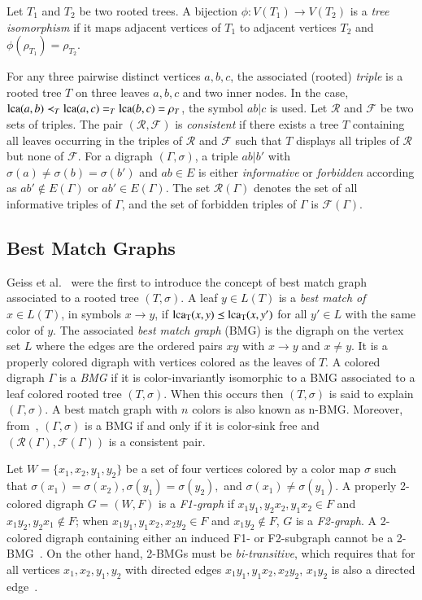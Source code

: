 \documentclass[final,3p,times]{elsarticle}
\begin{document}
Let $T_1$ and $T_2$ be two rooted trees. A bijection $\phi:V(T_1) \rightarrow V(T_2)$ is a \emph{tree isomorphism} if it maps adjacent vertices of $T_1$ to adjacent vertices $T_2$ and  $\phi(\rho_{T_1})=\rho_{T_2}$.

For any three pairwise distinct vertices $a,b,c$, the associated (rooted) \emph{triple} is a rooted tree $T$ on three leaves $a,b,c$ and two inner nodes. In the case, ${\rm{lca}}(a,b)\prec_T {\rm{lca}}(a,c)=_T{\rm{lca}}(b,c)=\rho_T$, the symbol $ab|c$ is used. Let $\mathscr{R}$ and $\mathscr{F}$ be two sets of triples. The pair $(\mathscr{R},\mathscr{F})$ is \emph{consistent} if there exists a tree $T$ containing all leaves occurring in the triples of $\mathscr{R}$ and $\mathscr{F}$ such that $T$ displays all triples of $\mathscr{R}$ but none of $\mathscr{F}$. For a digraph $(\Gamma,\sigma)$, a triple $ab|b'$ with $\sigma(a)\ne \sigma(b)=\sigma(b')$ and $ab\in E$ is either {\emph{informative}} or {\emph{forbidden}} according as $ab'\not\in E(\Gamma)$ or $ab'\in E(\Gamma)$. The set $\mathscr{R}(\Gamma)$ denotes the set of all informative triples of $\Gamma$, and the set of forbidden triples of $\Gamma$ is $\mathscr{F}(\Gamma)$. 

\subsection{Best Match Graphs}
Geiss et al.~\cite{Geiss:19a} were the first to introduce the concept of best match graph associated to a rooted tree $(T,\sigma)$. A leaf $y\in L(T)$ is a {\emph{best match of}} $x\in L(T)$, in symbols $x\rightarrow y$, if ${\rm{lca_T}}(x,y)\preceq {\rm{lca_T}}(x,y')$ for all $y'\in L$ with the same color of $y$. The associated {\emph{best match graph}} (BMG) is the digraph on the vertex set $L$ where the edges are the ordered pairs $xy$ with $x\rightarrow y$ and  $x\neq y$. It is a properly colored digraph with vertices colored as the leaves of $T$. A colored digraph $\Gamma$ is a \emph{BMG} if it is color-invariantly isomorphic to a BMG associated to a leaf colored rooted tree $(T,\sigma)$. When this occurs then $(T,\sigma)$ is said to explain $(\Gamma,\sigma)$. A best match graph with $n$ colors is also known as n-BMG. Moreover, from~\cite[Proposition~2.3]{korchmaros2021quasi}, $(\Gamma,\sigma)$ is a BMG if and only if it is color-sink free and $(\mathscr{R}(\Gamma),\mathscr{F}(\Gamma))$ is a consistent pair. 

Let $W=\{x_1,x_2,y_1,y_2\}$ be a set of four vertices colored by a color map $\sigma$ such that $\sigma(x_1)=\sigma(x_2),\sigma(y_1)=\sigma(y_2),$ and $\sigma(x_1)\neq \sigma(y_1)$. A properly 2-colored digraph $G=(W,F)$ is a \emph{F1-graph} if $x_1y_1,y_2x_2,y_1x_2 \in F$ and $x_1 y_2,y_2x_1 \notin F$; when $x_1y_1,y_1x_2,x_2y_2 \in F$ and $x_1y_2 \notin F$, $G$ is a \emph{F2-graph}. A 2-colored digraph containing either an induced F1- or F2-subgraph cannot be a 2-BMG~\cite[Lemma 4.2]{schaller2021complexity}. On the other hand, 2-BMGs must be \emph{bi-transitive}, which requires that for all vertices $x_1, x_2, y_1, y_2$ with directed edges $x_1y_1, y_1x_2, x_2y_2$, $x_1y_2$ is also a directed edge~\cite{Korchmaros:21a}.
\end{document}
